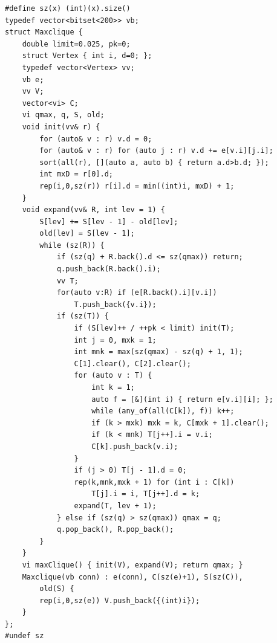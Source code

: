 \begin{lstlisting}
#define sz(x) (int)(x).size()
typedef vector<bitset<200>> vb;
struct Maxclique {
    double limit=0.025, pk=0;
    struct Vertex { int i, d=0; };
    typedef vector<Vertex> vv;
    vb e;
    vv V;
    vector<vi> C;
    vi qmax, q, S, old;
    void init(vv& r) {
        for (auto& v : r) v.d = 0;
        for (auto& v : r) for (auto j : r) v.d += e[v.i][j.i];
        sort(all(r), [](auto a, auto b) { return a.d>b.d; });
        int mxD = r[0].d;
        rep(i,0,sz(r)) r[i].d = min((int)i, mxD) + 1;
    }
    void expand(vv& R, int lev = 1) {
        S[lev] += S[lev - 1] - old[lev];
        old[lev] = S[lev - 1];
        while (sz(R)) {
            if (sz(q) + R.back().d <= sz(qmax)) return;
            q.push_back(R.back().i);
            vv T;
            for(auto v:R) if (e[R.back().i][v.i])
                T.push_back({v.i});
            if (sz(T)) {
                if (S[lev]++ / ++pk < limit) init(T);
                int j = 0, mxk = 1;
                int mnk = max(sz(qmax) - sz(q) + 1, 1);
                C[1].clear(), C[2].clear();
                for (auto v : T) {
                    int k = 1;
                    auto f = [&](int i) { return e[v.i][i]; };
                    while (any_of(all(C[k]), f)) k++;
                    if (k > mxk) mxk = k, C[mxk + 1].clear();
                    if (k < mnk) T[j++].i = v.i;
                    C[k].push_back(v.i);
                }
                if (j > 0) T[j - 1].d = 0;
                rep(k,mnk,mxk + 1) for (int i : C[k])
                    T[j].i = i, T[j++].d = k;
                expand(T, lev + 1);
            } else if (sz(q) > sz(qmax)) qmax = q;
            q.pop_back(), R.pop_back();
        }
    }
    vi maxClique() { init(V), expand(V); return qmax; }
    Maxclique(vb conn) : e(conn), C(sz(e)+1), S(sz(C)),
        old(S) {
        rep(i,0,sz(e)) V.push_back({(int)i});
    }
};
#undef sz
\end{lstlisting}
